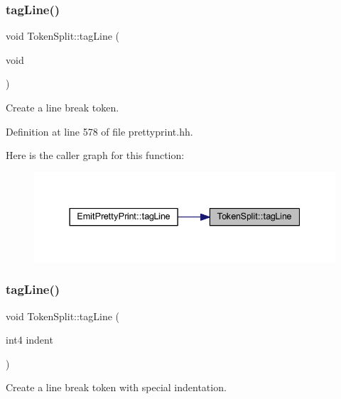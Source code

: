 \subsubsection{\texorpdfstring{tagLine()}{tagLine()}\hspace{0.1cm}{\footnotesize\ttfamily [1/2]}}
{\footnotesize\ttfamily void Token\+Split\+::tag\+Line (\begin{DoxyParamCaption}\item[{void}]{ }\end{DoxyParamCaption})\hspace{0.3cm}{\ttfamily [inline]}}



Create a line break token. 



Definition at line 578 of file prettyprint.\+hh.

Here is the caller graph for this function\+:
\nopagebreak
\begin{figure}[H]
\begin{center}
\leavevmode
\includegraphics[width=337pt]{class_token_split_a8723540e91b976c88ad9eadabc9ae54c_icgraph}
\end{center}
\end{figure}
\mbox{\label{class_token_split_aa61bb2fa64ac1ebce6982bfb173a4bf5}} 
\subsubsection{\texorpdfstring{tagLine()}{tagLine()}\hspace{0.1cm}{\footnotesize\ttfamily [2/2]}}
{\footnotesize\ttfamily void Token\+Split\+::tag\+Line (\begin{DoxyParamCaption}\item[{int4}]{indent }\end{DoxyParamCaption})\hspace{0.3cm}{\ttfamily [inline]}}



Create a line break token with special indentation. 




